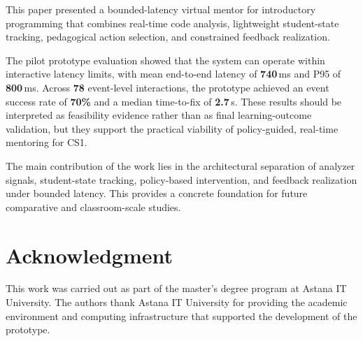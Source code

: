 \documentclass[conference]{IEEEtran}
\begin{document}
This paper presented a bounded-latency virtual mentor for introductory programming that combines real-time code analysis, lightweight student-state tracking, pedagogical action selection, and constrained feedback realization.

The pilot prototype evaluation showed that the system can operate within interactive latency limits, with mean end-to-end latency of \textbf{740}\,ms and P95 of \textbf{800}\,ms. Across \textbf{78} event-level interactions, the prototype achieved an event success rate of \textbf{70\%} and a median time-to-fix of \textbf{2.7}\,s. These results should be interpreted as feasibility evidence rather than as final learning-outcome validation, but they support the practical viability of policy-guided, real-time mentoring for CS1.

The main contribution of the work lies in the architectural separation of analyzer signals, student-state tracking, policy-based intervention, and feedback realization under bounded latency. This provides a concrete foundation for future comparative and classroom-scale studies.

\section*{Acknowledgment}

This work was carried out as part of the master’s degree program at Astana IT University. The authors thank Astana IT University for providing the academic environment and computing infrastructure that supported the development of the prototype.

\nocite{Francisco2022}
\nocite{Chrysafiadi2022}
\nocite{pankiewicz2023largelanguagemodelsgpt}
\nocite{AutomatedAssessmentToolsForGrading2022}
\nocite{AdaptiveImmediateFeedbackforBlockBasedProgramming}
\nocite{FeedbackSystemSupportingStudents2022}
\nocite{EvaluationofLLMtoolsforfeedbackgeneration}
\nocite{AutomatingHumanTutorStyleProgrammingFeedback}
\nocite{AITutoringinSDEducation}
\nocite{AutomatedGradingandFeedbackToolsforProgrammingEducationSystematicReview}


\end{document}
